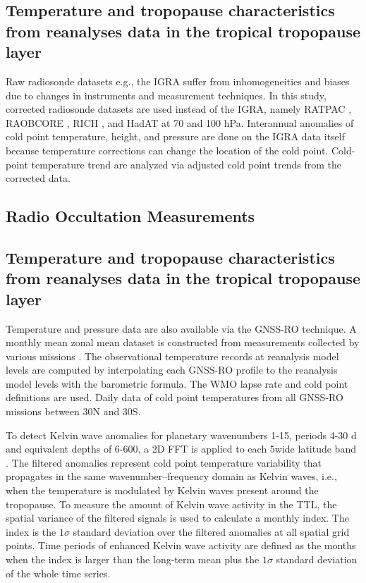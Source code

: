 \documentclass[fleqn,10pt]{wlscirep}
\begin{document}
\subsection*{Temperature and tropopause characteristics from reanalyses data in the tropical tropopause layer \cite{tegtmeier2020temperature}}

Raw radiosonde datasets e.g., the IGRA suffer from inhomogeneities and biases due to changes in instruments and measurement techniques. In this study, corrected radiosonde datasets are used instead of the IGRA, namely RATPAC \cite{free2005radiosonde}, RAOBCORE \cite{haimberger2007homogenization}, RICH \cite{haimberger2012homogenization}, and HadAT \cite{thorne2005revisiting} at 70 and 100 hPa. Interannual anomalies of cold point temperature, height, and pressure are done on the IGRA data itself because temperature corrections can change the location of the cold point. Cold-point temperature trend are analyzed via adjusted cold point trends from the corrected data. 

\subsection{Radio Occultation Measurements}
\subsection*{Temperature and tropopause characteristics from reanalyses data in the tropical tropopause layer \cite{tegtmeier2020temperature}}
Temperature and pressure data are also available via the GNSS-RO technique. A monthly mean zonal mean dataset is constructed from measurements collected by various missions \cite{wickert2001atmosphere, beyerle2005gps, anthes2008cosmic, von2011gras, hajj2004champ, beyerle2011first}. The observational temperature records at reanalysis model levels are computed by interpolating each GNSS-RO profile to the reanalysis model levels with the barometric formula. The WMO lapse rate and cold point definitions are used. Daily data of cold point temperatures from all GNSS-RO missions between 30\textdegree N and  30\textdegree S. 

To detect Kelvin wave anomalies for planetary wavenumbers 1-15, periods 4-30 d and equivalent depths of 6-600, a 2D FFT is applied to each 5\textdegree wide latitude band \cite{wheeler1999convectively}. The filtered anomalies represent cold point temperature variability that propagates in the same wavenumber–frequency domain as Kelvin waves, i.e., when the temperature is modulated by Kelvin waves present around the tropopause. To measure the amount of Kelvin wave activity in the TTL, the spatial variance of the filtered signals is used to calculate a monthly index. The index is the $1\sigma$ standard deviation over the filtered anomalies at all spatial grid points. Time periods
of enhanced Kelvin wave activity are defined as the months when the index is larger than the long-term mean plus the $1\sigma$ standard deviation of the whole time series.
\end{document}
